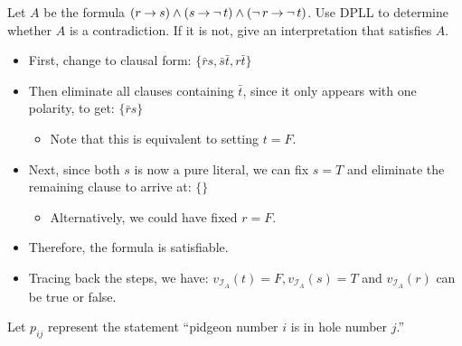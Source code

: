 \documentclass[]{exam}
\begin{document}
\begin{questions}
\begin{solution}
\end{solution}
\question Let $A$ be the formula $(r \mathbin{\rightarrow} s) \land (s \mathbin{\rightarrow} \mathop{\neg} t) \land (\mathop{\neg} r \mathbin{\rightarrow} \mathop{\neg} t)$.
Use DPLL to determine whether $A$ is a contradiction. If it is not, give an
interpretation that satisfies $A$.
\begin{solution}
\begin{itemize}
\item First, change to clausal form: $\{\bar{r}s,\bar{s}\bar{t},r\bar{t}\}$
\item Then eliminate all clauses containing $\bar{t}$, since it only appears with one polarity, to get: $\{\bar{r}s\}$
\begin{itemize}
\item Note that this is equivalent to setting $t = F$.
\end{itemize}
\item Next, since both $s$ is now a pure literal, we can fix
$s=T$ and eliminate the remaining clause to arrive at: $\{\}$
\begin{itemize}
\item Alternatively, we could have fixed $r = F$.
\end{itemize}
\item Therefore, the formula is satisfiable. 
\item Tracing back the steps, we have:
$v_{\mathcal{I}_A}(t) = F, v_{\mathcal{I}_A}(s) = T$ and $v_{\mathcal{I}_A}(r)$
can be true or false.
\end{itemize}
\end{solution}

\question Let $p_{ij}$ represent the statement ``pidgeon number $i$ is in hole number $j$.''
\end{questions}
\end{document}

